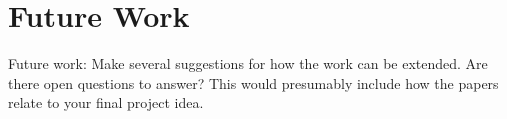 \section{Future Work}
\label{sec:futurework}

Future work: \cite{Ando2005} Make several suggestions for how the work can be extended. Are there open questions to answer? This would presumably include how the papers relate to your final project idea.

